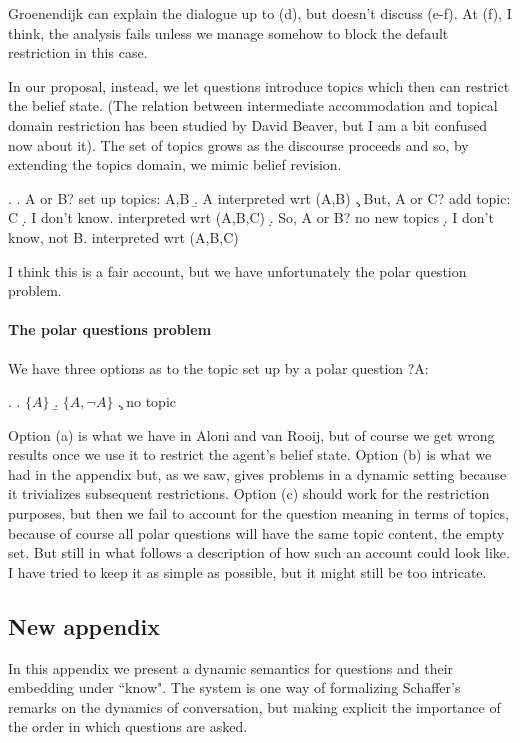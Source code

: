 \documentclass[a4paper, 11pt]{article}
\begin{document}
{ 
 Groenendijk can explain  the dialogue up to (d), but doesn't discuss (e-f). At (f),   I think, the analysis  fails unless we manage  somehow to block the   default restriction in this case.
 
 
In our proposal, instead, we let  questions introduce topics which then can restrict the belief state. (The relation between intermediate accommodation and topical domain restriction has been studied by David Beaver, but I am a bit confused now about it). The set of topics grows as the discourse proceeds and so,  by extending the topics domain,  we mimic belief revision. 

\ex. 
\a. A or B? \hfill  set up topics: A,B
\b. A \hfill interpreted wrt (A,B)
\c. But, A or C? \hfill add topic:  C
\d. I don't know. \hfill interpreted wrt (A,B,C)
\d. So, A or B? \hfill no  new topics
\d. I don't know, not B. \hfill interpreted wrt (A,B,C)

I think this is a fair account, but we have unfortunately the polar question problem.
\paragraph{The  polar questions problem} 
We have three options as to the topic set up by a polar question ?A:

 

\ex.     
\a. $\{ A \}$ 
\b. $\{A, \neg A\}$
\c. no topic

Option (a)   is what we have in Aloni and van Rooij, but of course we get wrong results once we use it to restrict the agent's belief state. Option (b) is what we had in the appendix
 but, as we saw, gives problems in a dynamic setting because it trivializes subsequent restrictions. Option (c) should work for the restriction purposes, but then we fail to account for the question meaning in terms of topics, because of course all polar questions will have the same topic content, the empty set. But still in what follows a description of how such an account could look like. I have tried to keep it as simple as possible, but it might still be too intricate.
}
\subsection*{New appendix}

 In this appendix we present a dynamic semantics for questions and
their embedding under ``know". The system is one way of
formalizing Schaffer's remarks on the dynamics of conversation,
but making explicit the importance of the order in which questions
are
asked.
\end{document}
